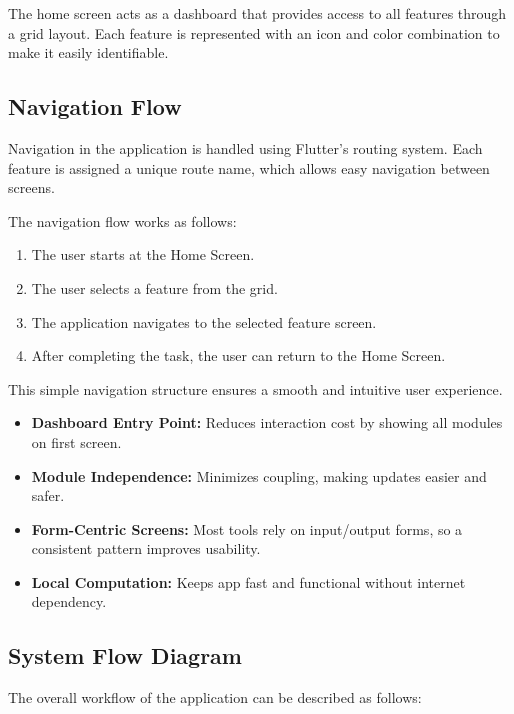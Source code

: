 \documentclass{article}
\begin{document}
The home screen acts as a dashboard that provides access to all features through a grid layout. Each feature is represented with an icon and color combination to make it easily identifiable.

\subsection{Navigation Flow}

Navigation in the application is handled using Flutter's routing system. Each feature is assigned a unique route name, which allows easy navigation between screens.

The navigation flow works as follows:

\begin{enumerate}
\item The user starts at the Home Screen.
\item The user selects a feature from the grid.
\item The application navigates to the selected feature screen.
\item After completing the task, the user can return to the Home Screen.
\end{enumerate}

This simple navigation structure ensures a smooth and intuitive user experience.

\begin{reportbox}
\begin{itemize}
\item \textbf{Dashboard Entry Point:} Reduces interaction cost by showing all modules on first screen.
\item \textbf{Module Independence:} Minimizes coupling, making updates easier and safer.
\item \textbf{Form-Centric Screens:} Most tools rely on input/output forms, so a consistent pattern improves usability.
\item \textbf{Local Computation:} Keeps app fast and functional without internet dependency.
\end{itemize}
\end{reportbox}

\subsection{System Flow Diagram}

The overall workflow of the application can be described as follows:
\end{document}
